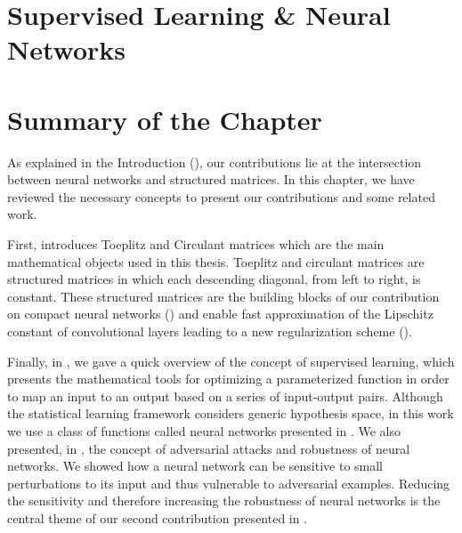 \section{Supervised Learning \& Neural Networks}
\label{section:ch2-supervised_learning_neural_networks}



\section{Summary of the Chapter}
\label{section:ch2-summary_of_the_background}

As explained in the Introduction (), our contributions lie at the intersection between neural networks and structured matrices.
In this chapter, we have reviewed the necessary concepts to present our contributions and some related work.

First,  introduces Toeplitz and Circulant matrices which are the main mathematical objects used in this thesis.
Toeplitz and circulant matrices are structured matrices in which each descending diagonal, from left to right, is constant.
These structured matrices are the building blocks of our contribution on compact neural networks () and enable fast approximation of the Lipschitz constant of convolutional layers leading to a new regularization scheme ().

Finally, in , we gave a quick overview of the concept of supervised learning, which presents the mathematical tools for optimizing a parameterized function in order to map an input to an output based on a series of input-output pairs. 
Although the statistical learning framework considers generic hypothesis space, in this work we use a class of functions called neural networks presented in .
We also presented, in , the concept of adversarial attacks and robustness of neural networks.
We showed how a neural network can be sensitive to small perturbations to its input and thus vulnerable to adversarial examples.
Reducing the sensitivity and therefore increasing the robustness of neural networks is the central theme of our second contribution presented in .





